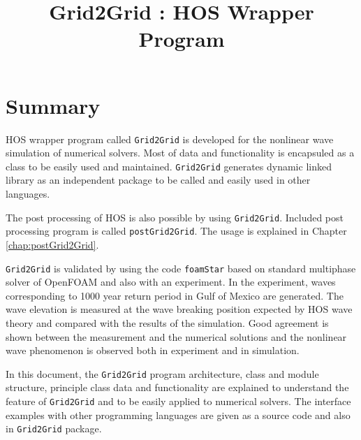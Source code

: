 

\title{Grid2Grid : HOS Wrapper Program }



	
	
	

	\tableofcontents	

	
	
	

		    

		    	

		
		
			

		

	
	
	
		
	\pagebreak
	\section{Summary}
	
	HOS wrapper program called \texttt{Grid2Grid} is developed for the nonlinear wave simulation of numerical solvers. Most of data and functionality is encapsuled as a class to be easily used and maintained. \texttt{Grid2Grid} generates dynamic linked library as an independent package to be called and easily used in other languages. 
	
	The post processing of HOS is also possible by using \texttt{Grid2Grid}. Included post processing program is called \texttt{postGrid2Grid}. The usage is explained in Chapter \ref{chap:postGrid2Grid}.
	
	\texttt{Grid2Grid} is validated by using the code \texttt{foamStar} based on standard multiphase solver of OpenFOAM and also with an experiment. In the experiment, waves corresponding to 1000 year return period in Gulf of Mexico are generated. The wave elevation is measured at the wave breaking position expected by HOS wave theory and compared with the results of the simulation. Good agreement is shown between the measurement and the numerical solutions and the nonlinear wave phenomenon is observed both in experiment and in simulation. 
	
	In this document, the \texttt{Grid2Grid} program architecture, class and module structure, principle class data and functionality are explained to understand the feature of \texttt{Grid2Grid} and to be easily applied to numerical solvers. The interface examples with other programming languages are given as a source code and also in \texttt{Grid2Grid} package. 	
	

	\pagebreak
	

	


